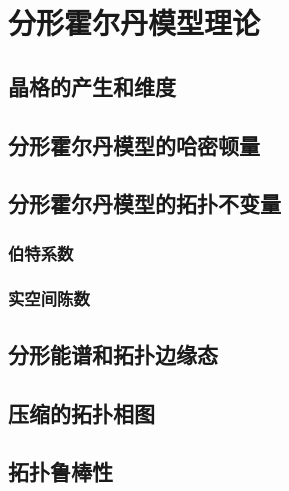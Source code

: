 \chapter{分形霍尔丹模型理论}
\section{晶格的产生和维度}
\section{分形霍尔丹模型的哈密顿量}
\section{分形霍尔丹模型的拓扑不变量}
\subsection{伯特系数}
\subsection{实空间陈数}
\section{分形能谱和拓扑边缘态}
\section{压缩的拓扑相图}
\section{拓扑鲁棒性}